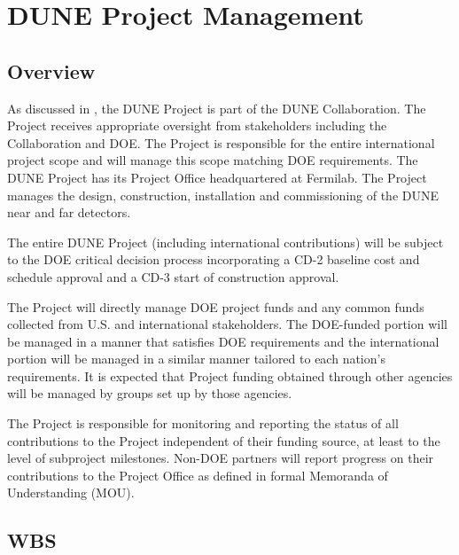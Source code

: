 \chapter{DUNE Project Management}
\label{ch:detectors-pm}

\section{Overview}

As discussed in \volintro, the DUNE Project is part of the DUNE
Collaboration. The Project receives appropriate oversight from
stakeholders including the Collaboration and DOE. The Project is
responsible for the entire international project scope and will manage
this scope matching DOE requirements. The DUNE Project has its Project Office
headquartered at Fermilab.
The Project manages the design, construction, installation and
commissioning of the DUNE near and far detectors.

The entire DUNE Project (including international contributions)
will be subject to the DOE critical decision process incorporating a
CD-2 baseline cost and schedule approval and a CD-3 start of construction approval.

The Project will directly manage DOE project funds and any common
funds collected from U.S. and international stakeholders. The
DOE-funded portion will be managed in a manner that satisfies DOE
requirements and the international portion will be managed in a
similar manner tailored to each nation's requirements. It is expected
that Project funding obtained through other agencies will be managed
by groups set up by those agencies.

The Project is responsible for monitoring and reporting the status of
all contributions to the Project independent of their funding source,
at least to the level of subproject milestones.  Non-DOE partners will
report progress on their contributions to the Project Office as
defined in formal Memoranda of Understanding (MOU).

\section[Work Breakdown Structure (WBS)]{WBS}

